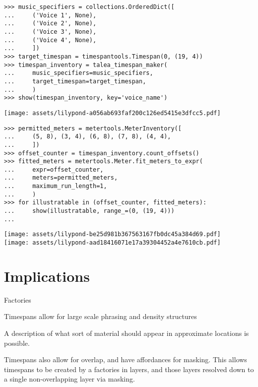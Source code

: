 \begin{singlespacing}
\vspace{-0.5\baselineskip}
\begin{lstlisting}
>>> music_specifiers = collections.OrderedDict([
...     ('Voice 1', None),
...     ('Voice 2', None),
...     ('Voice 3', None),
...     ('Voice 4', None),
...     ])
>>> target_timespan = timespantools.Timespan(0, (19, 4))
>>> timespan_inventory = talea_timespan_maker(
...     music_specifiers=music_specifiers,
...     target_timespan=target_timespan,
...     )
>>> show(timespan_inventory, key='voice_name')
\end{lstlisting}
\noindent\texttt{[image: assets/lilypond-a056ab693faf200c126ed5415e3dfcc5.pdf]}
\end{singlespacing}

\begin{comment}
<abjad>
permitted_meters = metertools.MeterInventory([
    (5, 8), (3, 4), (6, 8), (7, 8), (4, 4),
    ])
offset_counter = timespan_inventory.count_offsets()
fitted_meters = metertools.Meter.fit_meters_to_expr(
    expr=offset_counter,
    meters=permitted_meters,
    maximum_run_length=1,
    )
for illustratable in (offset_counter, fitted_meters):
    show(illustratable, range_=(0, (19, 4)))

</abjad>
\end{comment}

\begin{singlespacing}
\vspace{-0.5\baselineskip}
\begin{lstlisting}
>>> permitted_meters = metertools.MeterInventory([
...     (5, 8), (3, 4), (6, 8), (7, 8), (4, 4),
...     ])
>>> offset_counter = timespan_inventory.count_offsets()
>>> fitted_meters = metertools.Meter.fit_meters_to_expr(
...     expr=offset_counter,
...     meters=permitted_meters,
...     maximum_run_length=1,
...     )
>>> for illustratable in (offset_counter, fitted_meters):
...     show(illustratable, range_=(0, (19, 4)))
...
\end{lstlisting}
\noindent\texttt{[image: assets/lilypond-be25d981b367563167fb0dc45a384d69.pdf]}\\
\noindent\texttt{[image: assets/lilypond-aad18416071e17a39304452a4e7610cb.pdf]}
\end{singlespacing}

\section{Implications}

Factories

Timespans allow for large scale phrasing and density structures

A description of what sort of material should appear in approximate locations
is possible.

Timespans also allow for overlap, and have affordances for masking. This allows
timespans to be created by a factories in layers, and those layers resolved
down to a single non-overlapping layer via masking.